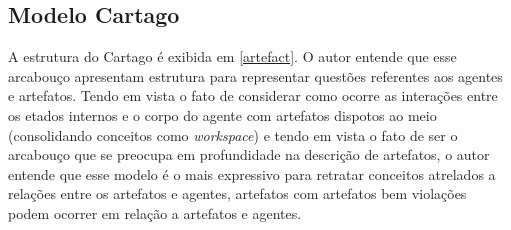 \subsection{Modelo Cartago}

A estrutura do Cartago é exibida em \ref{artefact}. O autor entende que esse arcabouço apresentam estrutura para representar questões referentes aos agentes e artefatos. Tendo em vista o fato de considerar como ocorre as interações entre os etados internos e o corpo do agente com artefatos dispotos ao meio (consolidando conceitos como \textit{workspace}) e tendo em vista o fato de ser o arcabouço que se preocupa em profundidade na descrição de artefatos, o autor entende que esse modelo é o mais expressivo para retratar conceitos atrelados a relações entre os artefatos e agentes, artefatos com artefatos bem  violações podem ocorrer em relação a artefatos e agentes.